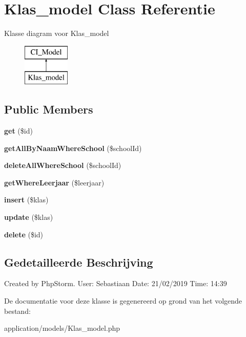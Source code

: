 \hypertarget{class_klas__model}{}\section{Klas\+\_\+model Class Referentie}
\label{class_klas__model}
Klasse diagram voor Klas\+\_\+model\begin{figure}[H]
\begin{center}
\leavevmode
\includegraphics[height=2.000000cm]{class_klas__model}
\end{center}
\end{figure}
\subsection*{Public Members}
\begin{DoxyCompactItemize}
\item 
\mbox{\label{class_klas__model_a50e3bfb586b2f42932a6a93f3fbb0828}} 
{\bfseries get} (\$id)
\item 
\mbox{\label{class_klas__model_a9f931878e27f42f7ccd7a01364079181}} 
{\bfseries get\+All\+By\+Naam\+Where\+School} (\$school\+Id)
\item 
\mbox{\label{class_klas__model_a858f0f0a43114d19bc6d7a2cf94e74c6}} 
{\bfseries delete\+All\+Where\+School} (\$school\+Id)
\item 
\mbox{\label{class_klas__model_adab30896b5821dd52315d51146c5b29d}} 
{\bfseries get\+Where\+Leerjaar} (\$leerjaar)
\item 
\mbox{\label{class_klas__model_ad9d2d86ab0451515a8dd6c99a9681ff5}} 
{\bfseries insert} (\$klas)
\item 
\mbox{\label{class_klas__model_a84008d01dfbcc76ba18b87f03fbde4f0}} 
{\bfseries update} (\$klas)
\item 
\mbox{\label{class_klas__model_a2f8258add505482d7f00ea26493a5723}} 
{\bfseries delete} (\$id)
\end{DoxyCompactItemize}


\subsection{Gedetailleerde Beschrijving}
Created by Php\+Storm. User\+: Sebastiaan Date\+: 21/02/2019 Time\+: 14\+:39 

De documentatie voor deze klasse is gegenereerd op grond van het volgende bestand\+:\begin{DoxyCompactItemize}
\item 
application/models/Klas\+\_\+model.\+php\end{DoxyCompactItemize}
